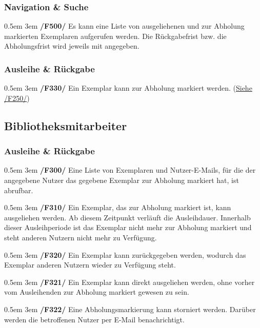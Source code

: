 \documentclass{article}
\newcommand{\specification}[3]{
	{\parindent 0.5em \hangindent 3em \hypertarget{spec:#1:#2}{\textbf{/#1#2/}} #3 \par \nobreak \vspace*{0.5em}}
}
\begin{document}
	\subsubsection{Navigation \& Suche}
		\specification{F}{500}{Es kann eine Liste von ausgeliehenen und zur Abholung markierten Exemplaren aufgerufen werden. Die Rückgabefrist bzw. die Abholungsfrist wird jeweils mit angegeben. }
	\subsubsection{Ausleihe \& Rückgabe}
		\specification{F}{330}{Ein Exemplar kann zur Abholung markiert werden. (\hyperlink{spec:F:250}{Siehe /F250/}) }
\subsection{Bibliotheksmitarbeiter}
	\subsubsection{Ausleihe \& Rückgabe}
		\specification{F}{300}{Eine Liste von Exemplaren und Nutzer-E-Mails, für die der angegebene Nutzer das gegebene Exemplar zur Abholung markiert hat, ist abrufbar. }
		\specification{F}{310}{Ein Exemplar, das zur Abholung markiert ist, kann ausgeliehen werden. Ab diesem Zeitpunkt verläuft die Ausleihdauer.
			Innerhalb dieser Ausleihperiode ist das Exemplar nicht mehr zur Abholung markiert und steht anderen Nutzern nicht mehr zu Verfügung. }
		\specification{F}{320}{Ein Exemplar kann zurückgegeben werden, wodurch das Exemplar anderen Nutzern wieder zu Verfügung steht. }
		\specification{F}{321}{Ein Exemplar kann direkt ausgeliehen werden, ohne vorher vom Ausleihenden zur Abholung markiert gewesen zu sein. }
		\specification{F}{322}{Eine Abholungsmarkierung kann storniert werden. Darüber werden die betroffenen Nutzer per E-Mail benachrichtigt. }
\end{document}
